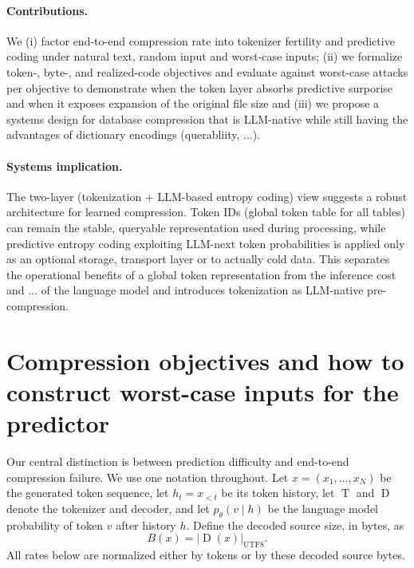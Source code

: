 \documentclass{article}
\newcommand{\bytes}[1]{\lvert #1\rvert_{\mathrm{UTF8}}}
\newcommand{\Dec}{\operatorname{D}}
\newcommand{\Tok}{\operatorname{T}}
\begin{document}
\paragraph{Contributions.}

We (i) factor end-to-end compression rate into tokenizer fertility and predictive coding under natural text, random input and worst-case inputs; (ii) we formalize token-, byte-, and realized-code objectives and evaluate against worst-case attacks per objective to demonstrate when the token layer absorbs predictive surporise and when it exposes expansion of the original file size and (iii) we propose a systems design for database compression that is LLM-native while still having the advantages of dictionary encodings (querabliity, ...). 


\paragraph{Systems implication.}
The two-layer (tokenization + LLM-based entropy coding) view suggests a robust architecture for learned compression. Token IDs (global token table for all tables) can remain the stable, queryable representation used during processing, while predictive entropy coding exploiting LLM-next token probabilities is applied only as an optional storage, transport layer or to actually cold data. This separates the operational benefits of a global token representation from the inference cost and ... of the language model and introduces tokenization as LLM-native pre-compression. 


\section{Compression objectives and how to construct worst-case inputs for the predictor}
\label{sec:attacks}


Our central distinction is between prediction difficulty and end-to-end compression failure. We use one notation throughout. Let
$x=(x_1,\ldots,x_N)$ be the generated token sequence, let $h_t=x_{<t}$ be its token history, let
$\Tok$ and $\Dec$ denote the tokenizer and decoder, and let $p_\theta(v\mid h)$ be the language model probability of token $v$ after history $h$.
Define the decoded source size, in bytes, as
\begin{equation}
  B(x) = \bytes{\Dec(x)}.
  \label{eq:source-bytes}
\end{equation}
All rates below are normalized either by tokens or by these decoded source bytes.
\end{document}
